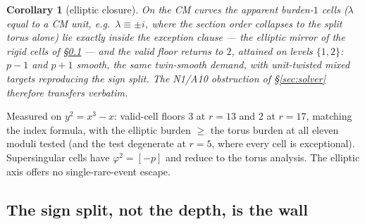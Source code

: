 \documentclass[11pt]{article}
\newtheorem{corollary}[theorem]{Corollary}
\theoremstyle{remark}
\begin{document}
\begin{corollary}[elliptic closure]\label{cor:elliptic}
On the CM curves the apparent burden-$1$ cells ($\lambda$ equal to a CM
unit, e.g.\ $\lambda \equiv \pm i$, where the section order collapses to
the split torus alone) lie exactly inside the exception clause --- the
elliptic mirror of the rigid cells of \S\ref{sec:signsplit} --- and the
valid floor returns to $2$, attained on levels $\{1, 2\}$: \emph{$p - 1$
and $p + 1$ smooth, the same twin-smooth demand}, with unit-twisted mixed
targets reproducing the sign split. The N1/A10 obstruction of
\S\ref{sec:solver} therefore transfers verbatim.
\end{corollary}

Measured on $y^2 = x^3 - x$: valid-cell floors $3$ at $r = 13$ and $2$ at
$r = 17$, matching the index formula, with the elliptic burden $\ge$ the
torus burden at all eleven moduli tested (and the test degenerate at
$r = 5$, where every cell is exceptional). Supersingular cells have
$\varphi^2 = [-p]$ and reduce to the torus analysis. The elliptic axis
offers no single-rare-event escape.

\subsection{The sign split, not the depth, is the wall}\label{sec:signsplit}
\end{document}

